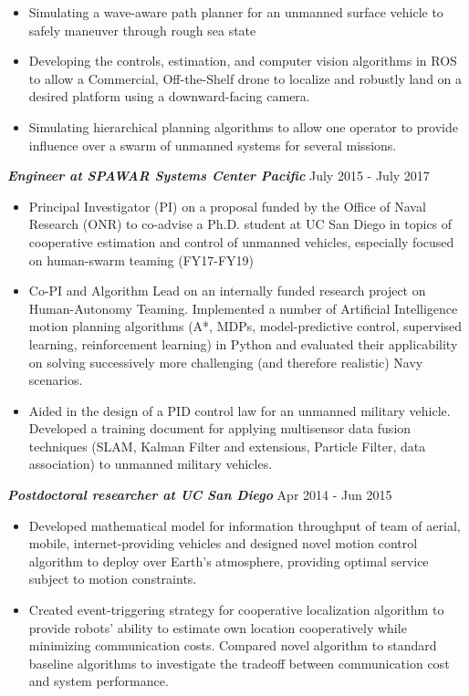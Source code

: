 \documentclass{res}
\begin{document}
\begin{resume}
 \vspace*{-0ex} 
\begin{itemize}
\item Simulating a wave-aware path planner for an unmanned surface vehicle to safely maneuver through rough sea state
\item Developing the controls, estimation, and computer vision algorithms in ROS to allow a Commercial, Off-the-Shelf drone to localize and robustly land on a desired platform using a downward-facing camera.
\item Simulating hierarchical planning algorithms to allow one operator to provide influence over a swarm of unmanned systems for several missions. 
\end{itemize}
\vspace*{-1ex}
{\sl \bf Engineer at SPAWAR Systems Center Pacific} \hfill July 2015 - July 2017 
\begin{itemize}
\item Principal Investigator (PI) on a proposal funded by the Office of Naval Research (ONR) to co-advise a Ph.D. student at UC San Diego in topics of cooperative estimation and control of unmanned vehicles, especially focused on human-swarm teaming (FY17-FY19)
\item Co-PI and Algorithm Lead on an internally funded research project on Human-Autonomy Teaming. Implemented a number of Artificial Intelligence motion planning algorithms (A*, MDPs, model-predictive control, supervised learning, reinforcement learning) in Python and evaluated their applicability on solving successively more challenging (and therefore realistic) Navy scenarios.
\item Aided in the design of a PID control law for an unmanned military vehicle.  Developed a training document for applying multisensor data fusion techniques (SLAM, Kalman Filter and extensions, Particle Filter, data association) to unmanned military vehicles.
\end{itemize}
\vspace*{-1ex}
{\sl \bf Postdoctoral researcher at UC San Diego} \hfill Apr 2014 - Jun 2015 
\begin{itemize}
\item Developed mathematical model for information throughput of team of aerial, mobile, internet-providing vehicles and designed novel motion control algorithm to deploy over Earth's atmosphere, providing optimal service subject to motion constraints.
%
\item Created event-triggering strategy for cooperative localization algorithm to provide robots' ability to estimate own location cooperatively while minimizing communication costs. Compared novel algorithm to standard baseline algorithms to investigate the tradeoff between communication cost and system performance.

\end{itemize}
\end{resume}
\end{document}
